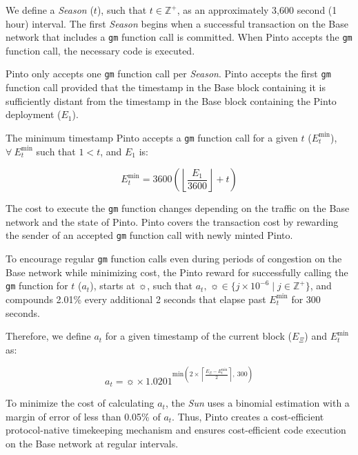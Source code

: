 \documentclass[tikz]{article}
\newcommand{\code}[1]{\texttt{#1}}
\newcommand{\term}[1]{\textsl{#1}}
\begin{document}
\newpage

We define a \term{Season} ($t$), such that $t \in \mathbb{Z}^{+}$, as an approximately 3,600 second (1 hour) interval. The first \term{Season} begins when a successful transaction on the Base network that includes a \code{gm} function call is committed. When Pinto accepts the \code{gm} function call, the necessary code is executed.

Pinto only accepts one \code{gm} function call per \term{Season}. Pinto accepts the first \code{gm} function call provided that the timestamp in the Base block containing it is sufficiently distant from the timestamp in the Base block containing the Pinto deployment ($E_{1}$).

The minimum timestamp Pinto accepts a \code{gm} function call for a given $t$ ($E_{t}^{\text{min}}$), $\forall\ E_{t}^{\text{min}}$ such that $1 < t$, and $E_{1}$ is:

    $$
        E_{t}^{\text{min}} = 
            3600{\left
                ({\left\lfloor\frac{E_{1}}{3600}\right\rfloor} + t\right)}
    $$

The cost to execute the \code{gm} function changes depending on the traffic on the Base network and the state of Pinto. Pinto covers the transaction cost by rewarding the sender of an accepted \code{gm} function call with newly minted Pinto. 

To encourage regular \code{gm} function calls even during periods of congestion on the Base network while minimizing cost, the Pinto reward for successfully calling the \code{gm} function for $t$ ($a_{t}$), starts at $\sun$, such that $a_{t},\ \sun \in \{j \times 10^{-6} \mid j \in \mathbb{Z}^{+} \}$, and compounds 2.01\% every additional 2 seconds that elapse past $E_{t}^{\text{min}}$ for 300 seconds.

Therefore, we define $a_{t}$ for a given timestamp of the current block ($E_{\Xi}$) and $E_{t}^{\text{min}}$ as:

    $$ 
        a_{t} = \sun \times 1.0201^{\text{min}(
                    2 \times \left \lceil \frac{E_{\Xi} - E_{t}^{\text{min}}}{2} \right \rceil,\ 
                    300)}
    $$

To minimize the cost of calculating $a_{t}$, the \term{Sun} uses a binomial estimation with a margin of error of less than 0.05\% of $a_{t}$. Thus, Pinto creates a cost-efficient protocol-native timekeeping mechanism and ensures cost-efficient code execution on the Base network at regular intervals.

\end{document}
